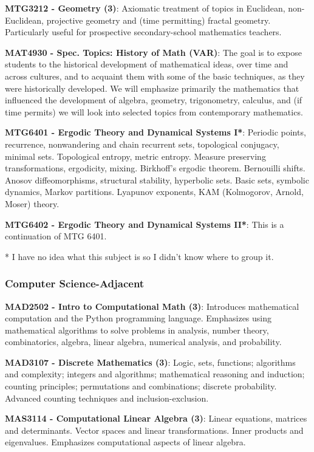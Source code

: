\documentclass[11pt]{article}
\begin{document}
\textbf{MTG3212 - Geometry (3)}: Axiomatic treatment of topics in Euclidean, non-Euclidean, projective geometry and (time permitting) fractal geometry. Particularly useful for prospective secondary-school mathematics teachers.

\textbf{MAT4930 - Spec. Topics: History of Math (VAR)}: The goal is to expose students to the historical development of mathematical ideas, over time and across cultures, and to acquaint them with some of the basic techniques,
as they were historically developed. We will emphasize primarily the mathematics that influenced the
development of algebra, geometry, trigonometry, calculus, and (if time permits) we will look into selected
topics from contemporary mathematics.

\textbf{MTG6401 - Ergodic Theory and Dynamical Systems I*}: Periodic points, recurrence, nonwandering and chain recurrent sets, topological conjugacy, minimal sets. Topological entropy, metric entropy. Measure preserving transformations, ergodicity, mixing. Birkhoff's ergodic theorem. Bernouilli shifts. Anosov diffeomorphisms, structural stability, hyperbolic sets. Basic sets, symbolic dynamics, Markov partitions. Lyapunov exponents, KAM (Kolmogorov, Arnold, Moser) theory.

\textbf{MTG6402 - Ergodic Theory and Dynamical Systems II*}: This is a continuation of MTG 6401.

* I have no idea what this subject is so I didn't know where to group it.

\subsubsection{\colorbox{comp}{Computer Science-Adjacent}}

\textbf{MAD2502 - Intro to Computational Math (3)}: Introduces mathematical computation and the Python programming language. Emphasizes using mathematical algorithms to solve problems in analysis, number theory, combinatorics, algebra, linear algebra, numerical analysis, and probability.

\textbf{MAD3107 - Discrete Mathematics (3)}: Logic, sets, functions; algorithms and complexity; integers and algorithms; mathematical reasoning and induction; counting principles; permutations and combinations; discrete probability. Advanced counting techniques and inclusion-exclusion. 

\textbf{MAS3114 - Computational Linear Algebra (3)}: Linear equations, matrices and determinants. Vector spaces and linear transformations. Inner products and eigenvalues. Emphasizes computational aspects of linear algebra.
\end{document}
